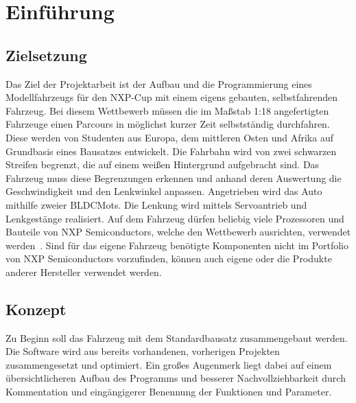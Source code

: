 

\rhead{\thepage} \chead{} 
\cfoot{}

\section{Einführung}\label{Sec1}

\subsection{Zielsetzung}\label{Sub1Sec1}

Das Ziel der Projektarbeit ist der Aufbau und die Programmierung eines Modellfahrzeugs für den \ac{NXP}-Cup mit einem eigens gebauten, selbstfahrenden Fahrzeug. Bei diesem Wettbewerb müssen die im Maßstab 1:18 angefertigten Fahrzeuge einen Parcours in möglichst kurzer Zeit selbstständig durchfahren. Diese werden von Studenten aus Europa, dem mittleren Osten und Afrika auf Grundbasis eines Bausatzes entwickelt. Die Fahrbahn wird von zwei schwarzen Streifen begrenzt, die auf einem weißen Hintergrund aufgebracht sind. Das Fahrzeug muss diese Begrenzungen erkennen und anhand deren Auswertung die Geschwindigkeit und den Lenkwinkel anpassen. Angetrieben wird das Auto mithilfe zweier \acp{BLDCMot}. Die Lenkung wird mittels Servoantrieb und Lenkgestänge realisiert. Auf dem Fahrzeug dürfen beliebig viele Prozessoren und Bauteile von NXP Semiconductors, welche den Wettbewerb ausrichten, verwendet werden~\cite{MWil}. Sind für das eigene Fahrzeug benötigte Komponenten nicht im Portfolio von NXP Semiconductors vorzufinden, können auch eigene oder die Produkte anderer Hersteller verwendet werden. 

\subsection{Konzept}\label{Sub1Sec2}

Zu Beginn soll das Fahrzeug mit dem Standardbausatz zusammengebaut werden. Die Software wird aus bereits vorhandenen, vorherigen Projekten zusammengesetzt und optimiert. Ein großes Augenmerk liegt dabei auf einem übersichtlicheren Aufbau des Programms und besserer Nachvollziehbarkeit durch Kommentation und eingängigerer Benennung der Funktionen und Parameter.\vspace{11pt}

